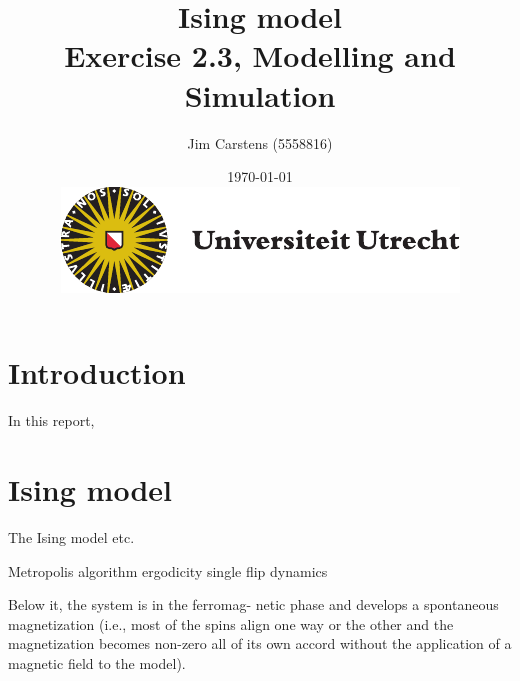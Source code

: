 \documentclass[a4paper]{article}
\title{\textbf{Ising model} \\\large{Exercise 2.3, Modelling and Simulation}}
\author{Jim Carstens (5558816)}
\date{\today \\ \includegraphics[scale=0.4]{uulogo.pdf}}
\begin{document}
\maketitle
\hrulefill
\tableofcontents
\hrulefill
\section*{Introduction}
In this report, 

\section{Ising model}  \label{sec:c}
The Ising model etc.

Metropolis algorithm
ergodicity single flip dynamics


Below it, the system is in the ferromag-
netic phase and develops a spontaneous magnetization (i.e., most of the
spins align one way or the other and the magnetization becomes non-zero all
of its own accord without the application of a magnetic field to the model).




\end{document}

